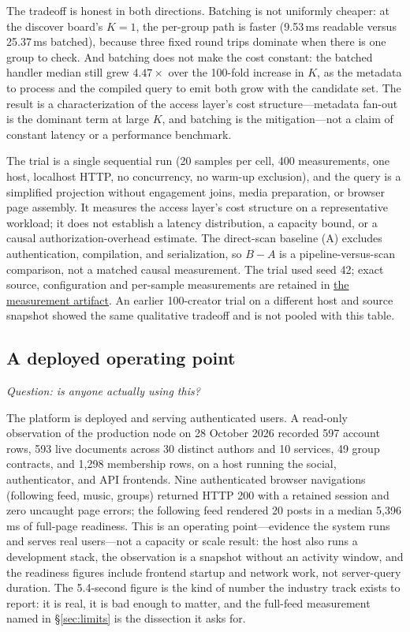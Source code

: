\documentclass[sigconf, nonacm]{acmart}
\newcommand{\artifactbase}{https://github.com/jacoby149/web10}
\newcommand{\domainartifactrev}{26720acba859c7eb03fc5d26a6221cdde5b764a1}
\newcommand{\domainartifactdir}[2]{\href{\artifactbase/tree/\domainartifactrev/#1}{#2}}
\begin{document}
The tradeoff is honest in both directions. Batching is not uniformly
cheaper: at the discover board's $K=1$, the per-group path is faster
(9.53\,ms readable versus 25.37\,ms batched), because three fixed round
trips dominate when there is one group to check. And batching does not make
the cost constant: the batched handler median still grew $4.47\times$ over
the 100-fold increase in $K$, as the metadata to process and the compiled
query to emit both grow with the candidate set. The result is a
characterization of the access layer's cost structure---metadata fan-out is
the dominant term at large $K$, and batching is the mitigation---not a claim
of constant latency or a performance benchmark.

The trial is a single sequential run (20 samples per cell, 400 measurements,
one host, localhost HTTP, no concurrency, no warm-up exclusion), and the
query is a simplified projection without engagement joins, media preparation,
or browser page assembly. It measures the access layer's cost structure on a
representative workload; it does not establish a latency distribution, a
capacity bound, or a causal authorization-overhead estimate. The direct-scan
baseline (A) excludes authentication, compilation, and serialization, so
$B - A$ is a pipeline-versus-scan comparison, not a matched causal
measurement. The trial used seed 42; exact source, configuration and
per-sample measurements are retained in
\domainartifactdir{research/experiments/costfn}{the measurement artifact}. An
earlier 100-creator trial on a different host and source snapshot showed the
same qualitative tradeoff and is not pooled with this table.

\subsection{A deployed operating point}
\label{sec:operating}

\emph{Question: is anyone actually using this?}

The platform is deployed and serving authenticated users. A read-only
observation of the production node on 28 October 2026 recorded 597 account
rows, 593 live documents across 30 distinct authors and 10 services, 49
group contracts, and 1,298 membership rows, on a host running the social,
authenticator, and API frontends. Nine authenticated browser navigations
(following feed, music, groups) returned HTTP 200 with a retained session and
zero uncaught page errors; the following feed rendered 20 posts in a median
5,396\,ms of full-page readiness. This is an operating point---evidence the
system runs and serves real users---not a capacity or scale result: the host
also runs a development stack, the observation is a snapshot without an
activity window, and the readiness figures include frontend startup and
network work, not server-query duration. The 5.4-second figure is the kind of
number the industry track exists to report: it is real, it is bad enough to
matter, and the full-feed measurement named in \S\ref{sec:limits} is the
dissection it asks for.
\end{document}
